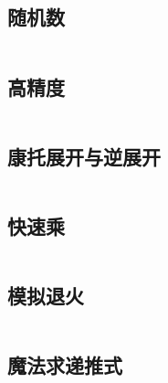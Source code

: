 \documentclass[UTF8]{ctexart}
\begin{document}
\subsection{随机数}
\inputminted{cpp}{others/随机数.cpp}

\subsection{高精度}
\inputminted{cpp}{others/高精度1.cpp}

\subsection{康托展开与逆展开}
\inputminted{cpp}{others/康托展开与康托逆展开.cpp}

\subsection{快速乘}
\inputminted{cpp}{others/快速乘.cpp}

\subsection{模拟退火}
\inputminted{cpp}{others/模拟退火.cpp}

\subsection{魔法求递推式}
\inputminted{cpp}{others/魔法求递推式.cpp}



\end{document}
